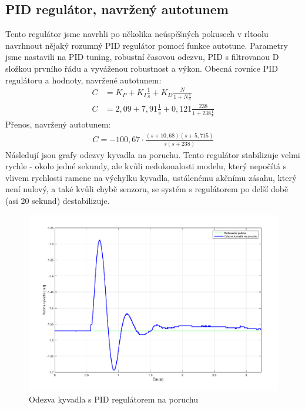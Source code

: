 \documentclass[a4paper,12pt]{article}
\begin{document}
\subsection{PID regulátor, navržený autotunem}
Tento regulátor jsme navrhli po několika neúspěšných pokusech v rltoolu navrhnout nějaký rozumný PID regulátor pomocí funkce autotune. Parametry jsme nastavili na PID tuning, robustní časovou odezvu, PID s filtrovanou D složkou prvního řádu a vyváženou robustnost a výkon.
\newline
Obecná rovnice PID regulátoru a hodnoty, navržené autotunem:
\begin{align*}
C &= K_P + K_I\frac{1}{s} + K_D\frac{N}{1+N\frac{1}{s}}	\\
C &= 2,09 + 7,91\frac{1}{s} + 0,121\frac{238}{1 + 238\frac{1}{s}}
\end{align*}
Přenos, navržený autotunem:
\begin{align*}
C = -100,67\cdot\frac{(s+10,68)(s+5,715)}{s(s+238)}
\end{align*}
Následují jsou grafy odezvy kyvadla na poruchu. Tento regulátor stabilizuje velmi rychle - okolo jedné sekundy, ale kvůli nedokonalosti modelu, který nepočítá s vlivem rychlosti ramene na výchylku kyvadla, ustálenému akčnímu zásahu, který není nulový, a také kvůli chybě senzoru, se systém s regulátorem po delší době (asi 20 sekund) destabilizuje.
\begin{figure}[H]
	\centering
    \includegraphics[scale=0.55]{odezva_kyvadlo_PID}
    \caption{Odezva kyvadla s PID regulátorem na poruchu}
\end{figure}
\end{document}
